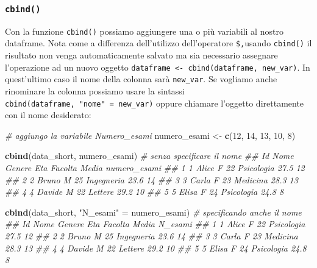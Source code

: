 \documentclass[
]{book}
\newenvironment{Shaded}{\begin{snugshade}}{\end{snugshade}}
\newcommand{\CommentTok}[1]{\textcolor[rgb]{0.56,0.35,0.01}{\textit{#1}}}
\newcommand{\DecValTok}[1]{\textcolor[rgb]{0.00,0.00,0.81}{#1}}
\newcommand{\KeywordTok}[1]{\textcolor[rgb]{0.13,0.29,0.53}{\textbf{#1}}}
\newcommand{\NormalTok}[1]{#1}
\newcommand{\StringTok}[1]{\textcolor[rgb]{0.31,0.60,0.02}{#1}}
\begin{document}
\hypertarget{cbind}{%
\subsubsection*{\texorpdfstring{\texttt{cbind()}}{cbind()}}\label{cbind}}

Con la funzione \texttt{cbind()} possiamo aggiungere una o più variabili al nostro dataframe. Nota come a differenza dell'utilizzo dell'operatore \texttt{\$,}usando \texttt{cbind()} il risultato non venga automaticamente salvato ma sia necessario assegnare l'operazione ad un nuovo oggetto \texttt{dataframe\ \textless{}-\ cbind(dataframe,\ new\_var)}. In quest'ultimo caso il nome della colonna sarà \texttt{new\_var}. Se vogliamo anche rinominare la colonna possiamo usare la sintassi \texttt{cbind(dataframe,\ "nome"\ =\ new\_var)} oppure chiamare l'oggetto direttamente con il nome desiderato:

\begin{Shaded}
\begin{Highlighting}[]
\CommentTok{# aggiungo la variabile Numero_esami}
\NormalTok{numero_esami <-}\StringTok{ }\KeywordTok{c}\NormalTok{(}\DecValTok{12}\NormalTok{, }\DecValTok{14}\NormalTok{, }\DecValTok{13}\NormalTok{, }\DecValTok{10}\NormalTok{, }\DecValTok{8}\NormalTok{)}

\KeywordTok{cbind}\NormalTok{(data_short, numero_esami) }\CommentTok{# senza specificare il nome}
\CommentTok{##   Id   Nome Genere Eta    Facolta Media numero_esami}
\CommentTok{## 1  1  Alice      F  22 Psicologia  27.5           12}
\CommentTok{## 2  2  Bruno      M  25 Ingegneria  23.6           14}
\CommentTok{## 3  3  Carla      F  23   Medicina  28.3           13}
\CommentTok{## 4  4 Davide      M  22    Lettere  29.2           10}
\CommentTok{## 5  5  Elisa      F  24 Psicologia  24.8            8}

\KeywordTok{cbind}\NormalTok{(data_short, }\StringTok{"N_esami"}\NormalTok{ =}\StringTok{ }\NormalTok{numero_esami) }\CommentTok{# specificando anche il nome}
\CommentTok{##   Id   Nome Genere Eta    Facolta Media N_esami}
\CommentTok{## 1  1  Alice      F  22 Psicologia  27.5      12}
\CommentTok{## 2  2  Bruno      M  25 Ingegneria  23.6      14}
\CommentTok{## 3  3  Carla      F  23   Medicina  28.3      13}
\CommentTok{## 4  4 Davide      M  22    Lettere  29.2      10}
\CommentTok{## 5  5  Elisa      F  24 Psicologia  24.8       8}
\end{Highlighting}
\end{Shaded}
\end{document}
